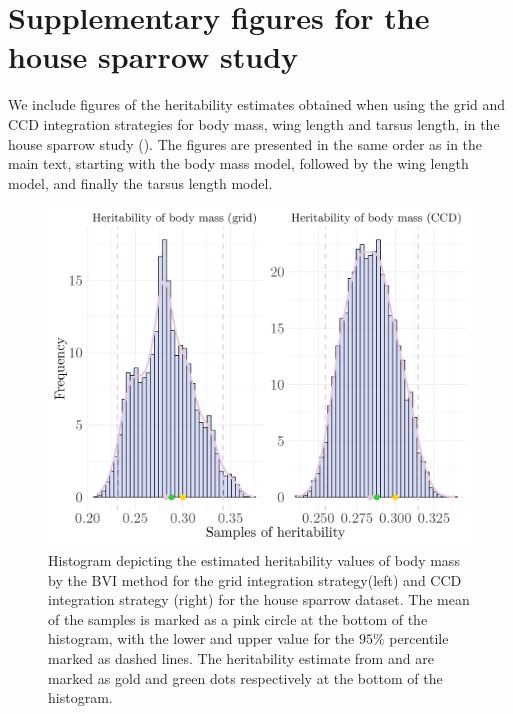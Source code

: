 \section{Supplementary figures for the house sparrow study}
\label{sec:supplementary_sparrows}

We include figures of the heritability estimates obtained when using the grid and CCD integration strategies for body mass, wing length and tarsus length, in the house sparrow study (). The figures are presented in the same order as in the main text, starting with the body mass model, followed by the wing length model, and finally the tarsus length model.
\begin{figure}[ht]
  \centering
  \includegraphics[width=0.7\linewidth]{Figures/House sparrow study/Heritability_mass_combined.png}
  \caption[Estimated heritability of body mass from grid and CCD strategy]{Histogram depicting the estimated heritability values of body mass by the BVI method for the grid integration strategy(left) and CCD integration strategy (right) for the house sparrow dataset. The mean of the samples is marked as a pink circle at the bottom of the histogram, with the lower and upper value for the $95\%$ percentile marked as dashed lines. The heritability estimate from \citet{Silva2017} and \citet{Muff2019Genetic} are marked as gold and green dots respectively at the bottom of the histogram.}
  \label{fig:heritability_mass_combined_grid_ccd}
\end{figure}

